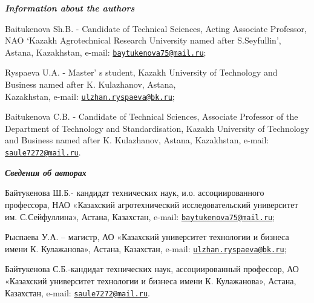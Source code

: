 \begin{authorinfo}
\emph{{\bfseries Information about the authors}}

Baitukenova Sh.B. - Candidate of Technical Sciences, Acting Associate
Professor, NAO `Kazakh Agrotechnical Research University named after
S.Seyfullin', Astana, Kazakhstan, e-mail:
\href{mailto:baytukenova75@mail.ru}{\nolinkurl{baytukenova75@mail.ru}};

Ryspaeva U.A. - Master' s student, Kazakh University of
Technology and Business named after K. Kulazhanov, Astana, \\Kazakhstan,
e-mail:
\href{mailto:ulzhan.ryspaeva@bk.ru}{\nolinkurl{ulzhan.ryspaeva@bk.ru}};

Baitukenova C.B. - Candidate of Technical Sciences, Associate Professor
of the Department of Technology and Standardisation, Kazakh University
of Technology and Business named after K. Kulazhanov, Astana,
Kazakhstan, e-mail:
\href{mailto:saule7272@mail.ru}{\nolinkurl{saule7272@mail.ru}}.

\emph{{\bfseries Сведения об авторах}}

Байтукенова Ш.Б.- кандидат технических наук, и.о. ассоциированного
профессора, НАО «Казахский агротехнический исследовательский университет
им. С.Сейфуллина», Астана, Казахстан, e-mail:
\href{mailto:baytukenova75@mail.ru}{\nolinkurl{baytukenova75@mail.ru}};

Рыспаева У.А. -- магистр, АО «Казахский университет технологии и бизнеса
имени К. Кулажанова», Астана, Казахстан, e-mail:
\href{mailto:ulzhan.ryspaeva@bk.ru}{\nolinkurl{ulzhan.ryspaeva@bk.ru}};

Байтукенова С.Б.-кандидат технических наук, ассоциированный профессор,
АО «Казахский университет технологии и бизнеса имени К. Кулажанова»,
Астана, Казахстан, e-mail:
\href{mailto:saule7272@mail.ru}{\nolinkurl{saule7272@mail.ru}}.
\end{authorinfo}

